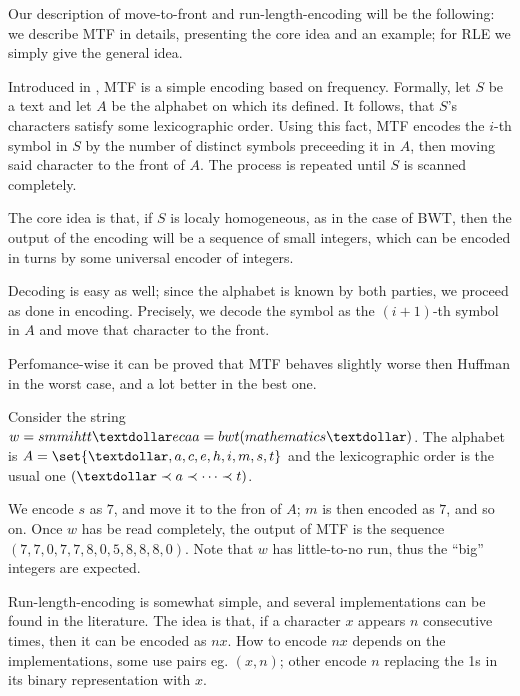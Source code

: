 \documentclass{subfiles}
\begin{document}
    Our description of move-to-front and run-length-encoding will be the following:
        we describe MTF in details, presenting the core idea and an example;
        for RLE we simply give the general idea.

    Introduced in \cite{bentleySTW86}, MTF is a simple encoding based on frequency.
        Formally, let \(S\) be a text and let \(A\) be the alphabet on which its defined.
        It follows, that \(S\)'s characters satisfy some lexicographic order.
        Using this fact, MTF encodes the \(i\)-th symbol in \(S\) by the 
        number of distinct symbols preceeding it in \(A\), 
        then moving said character to the front of \(A\).
        The process is repeated until \(S\) is scanned completely.

    The core idea is that, if \(S\) is localy homogeneous, as in the case of BWT,
        then the output of the encoding will be a sequence of small integers,
        which can be encoded in turns by some universal encoder of integers.

    Decoding is easy as well; since the alphabet is known by both parties,
        we proceed as done in encoding. Precisely, we decode the symbol as 
        the \((i + 1)\)-th symbol in \(A\) and move that character to the front.

    Perfomance-wise it can be proved that MTF behaves slightly worse then Huffman 
        in the worst case, and a lot better in the best one.

    \begin{example*}
        Consider the string \(w = smmihtt\textdollar ecaa = bwt(mathematics\textdollar)\). 
            The alphabet is \(A = \set{\textdollar, a, c, e, h, i, m, s, t}\) and the lexicographic 
            order is the usual one \((\textdollar \prec a \prec \cdots \prec t)\). 

        We encode \(s\) as \(7\), and move it to the fron of \(A\);
            \(m\) is then encoded as \(7\), and so on. 
            Once \(w\) has be read completely, the output of MTF is the sequence
            \((7, 7, 0, 7, 7, 8, 0, 5, 8, 8, 8, 0)\). 
            Note that \(w\) has little-to-no run, thus the ``big'' integers are expected.
    \end{example*}

    Run-length-encoding is somewhat simple, and several implementations can be found
        in the literature. The idea is that, if a character \(x\) appears \(n\)
        consecutive times, then it can be encoded as \(nx\).
        How to encode \(nx\) depends on the implementations,
        some use pairs eg. \((x, n)\); other encode \(n\) replacing the 1s in 
        its binary representation with \(x\). 
\end{document}
